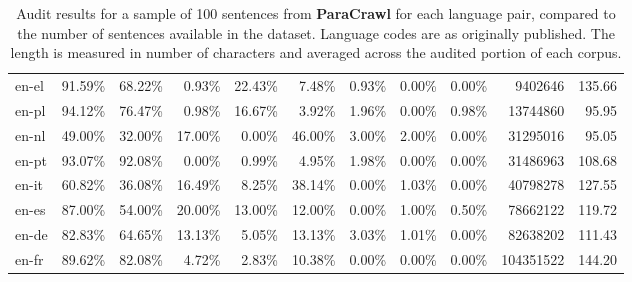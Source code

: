 \begin{table*}[hbt!]
{\begin{tabular}{l|rrrr|rrrr|rr}
            en-el & 91.59\% & 68.22\% & 0.93\%  & 22.43\% & 7.48\%  & 0.93\%  & 0.00\%  & 0.00\% & 9402646      & 135.66            \\
            en-pl & 94.12\% & 76.47\% & 0.98\%  & 16.67\% & 3.92\%  & 1.96\%  & 0.00\%  & 0.98\% & 13744860     & 95.95             \\
            en-nl & 49.00\% & 32.00\% & 17.00\% & 0.00\%  & 46.00\% & 3.00\%  & 2.00\%  & 0.00\% & 31295016     & 95.05             \\
            en-pt & 93.07\% & 92.08\% & 0.00\%  & 0.99\%  & 4.95\%  & 1.98\%  & 0.00\%  & 0.00\% & 31486963     & 108.68            \\
            en-it & 60.82\% & 36.08\% & 16.49\% & 8.25\%  & 38.14\% & 0.00\%  & 1.03\%  & 0.00\% & 40798278     & 127.55            \\
            en-es & 87.00\% & 54.00\% & 20.00\% & 13.00\% & 12.00\% & 0.00\%  & 1.00\%  & 0.50\% & 78662122     & 119.72            \\
            en-de & 82.83\% & 64.65\% & 13.13\% & 5.05\%  & 13.13\% & 3.03\%  & 1.01\%  & 0.00\% & 82638202     & 111.43            \\
            en-fr & 89.62\% & 82.08\% & 4.72\%  & 2.83\%  & 10.38\% & 0.00\%  & 0.00\%  & 0.00\% & 104351522    & 144.20            \\
            \bottomrule
        \end{tabular} %
    }
    \caption{Audit results for a sample of 100 sentences from \textbf{ParaCrawl} for each language pair, compared to the number of sentences available in the dataset. Language codes are as originally published.  The length is measured in number of characters and averaged across the audited portion of each corpus.}
    \label{tab:paracrawl-full}
\end{table*}

\clearpage



